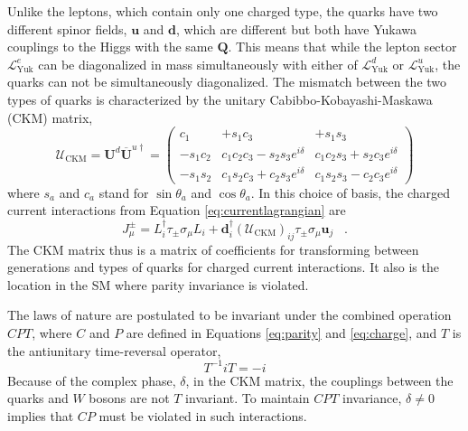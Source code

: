  Unlike the leptons, which contain only one
  charged type, the quarks have two 
  different spinor fields,
  $\mathbf{u}$ and $\mathbf{d}$, which  are different
  but both have Yukawa couplings to the Higgs
  with the same $\mathbf{Q}$.
 This means that while the lepton
  sector $\mathcal{L}_{\mathrm{Yuk}}^e$ can be diagonalized in 
  mass simultaneously with either of
  $\mathcal{L}_{\mathrm{Yuk}}^d$ or $\mathcal{L}_{\mathrm{Yuk}}^u$,
  the quarks 
  can not be simultaneously diagonalized.
 The mismatch between the two types of
  quarks is characterized by the unitary
  Cabibbo-Kobayashi-Maskawa (CKM) matrix,
\begin{equation}\label{eq:ckmmatrix}
 \mathcal{U}_{\mathrm{CKM}} = \mathbf{U}^d\overline{\mathbf{U}}^{u\dagger}=
\begin{pmatrix}  c_1     & +s_1 c_3 & + s_1 s_3 \\
  -s_1 c_2 & c_1 c_2 c_3 - s_2 s_3 e^{i\delta} & c_1 c_2 s_3 + s_2 c_3 e^{i\delta} \\
  -s_1 s_2 & c_1 s_2 c_3 + c_2 s_3 e^{i\delta} & c_1 s_2 s_3 - c_2 c_3 e^{i\delta}
  \end{pmatrix}
\end{equation}
  where $s_a$ and $ c_a$ stand for $\sin\theta_a$ and $\cos\theta_a$.
 In this choice of basis,
  the charged current interactions 
  from Equation \ref{eq:currentlagrangian} are
\begin{equation}
 J_\mu^{\pm} =  
  L_i^\dagger \tau_\pm \sigma_\mu L_i 
  + \mathbf{d}^\dagger_{i} \left(\mathcal{U}_{\mathrm{CKM}}\right)_{ij}
  \tau_\pm \sigma_\mu \mathbf{u}_{j}\;\;\;.
\end{equation}
 The CKM matrix thus is a matrix of coefficients
  for transforming between generations
  and types of quarks for charged current interactions.
 It also is the location in the SM where parity 
   invariance is violated.

 The laws of nature are postulated
  to be invariant under the combined
  operation $CPT$, where $C$ and $P$
  are defined in Equations \ref{eq:parity}
  and \ref{eq:charge}, and 
  $T$ is the antiunitary time-reversal operator,
\begin{equation}\label{eq:time}
T^{-1}iT=-i
\end{equation}
 Because of the complex phase, $\delta$,
  in the CKM matrix, the couplings
  between the quarks and $W$ bosons are not
  $T$ invariant. 
 To maintain $CPT$ invariance,
  $\delta\neq 0$ implies that $CP$ must be violated
  in such interactions.

